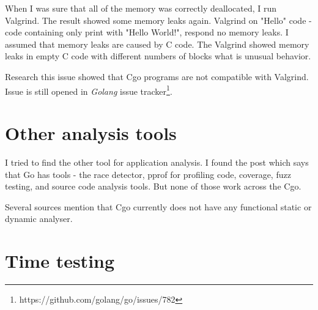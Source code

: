 \documentclass[
  12pt, 
  digital, %
  notable,   %
  nolof,     %
  nolot,     %
]{fithesis3}
\begin{document}
When I was sure that all of the memory was correctly deallocated, I run Valgrind. The result showed 
some memory leaks again. Valgrind on "Hello" code - code containing only print with "Hello 
World!", respond no memory leaks. I assumed that memory leaks are caused by C code. The Valgrind 
showed memory leaks in empty C code with different numbers of blocks what is unusual behavior.	

Research this issue showed that Cgo programs are not compatible with Valgrind. Issue is still 
opened in \textit{Golang} issue tracker\footnote{https://github.com/golang/go/issues/782}. 


\section{Other analysis tools}

I tried to find the other tool for application analysis. I found the post \cite{dave} which says 
that Go has tools - the race detector, pprof for profiling code, coverage, fuzz testing, 
and source code analysis tools. But none of those work across the Cgo.

Several sources mention that Cgo currently does not have any functional static or dynamic analyser. 

\section{Time testing}
\end{document}
